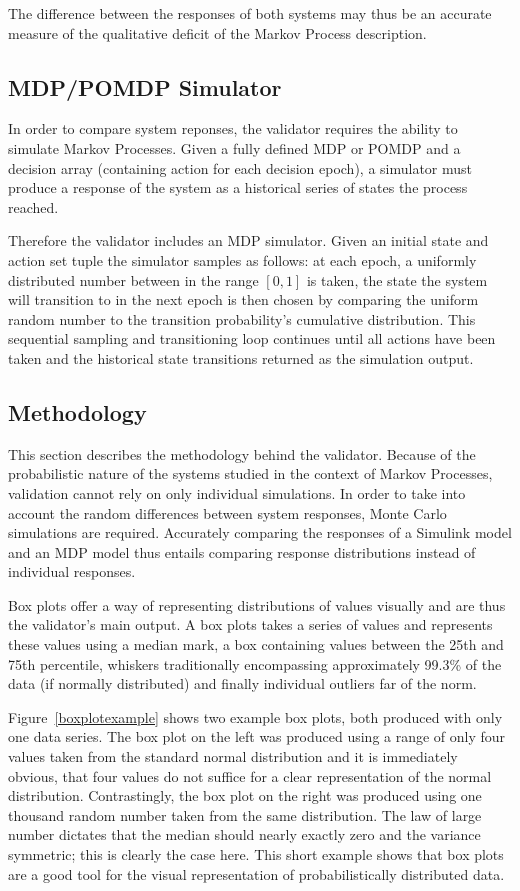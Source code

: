 The difference between the responses of both systems may thus be an accurate measure of the qualitative deficit of the Markov Process description.

\subsection{MDP/POMDP Simulator}

In order to compare system reponses, the validator requires the ability to simulate Markov Processes. Given a fully defined MDP or POMDP and a decision array (containing action for each decision epoch), a simulator must produce a response of the system as a historical series of states the process reached.

Therefore the validator includes an MDP simulator. Given an initial state and action set tuple the simulator samples as follows: at each epoch, a uniformly distributed number between in the range $[0,1]$ is taken, the state the system will transition to in the next epoch is then chosen by comparing the uniform random number to the transition probability's cumulative distribution. This sequential sampling and transitioning loop continues until all actions have been taken and the historical state transitions returned as the simulation output.

\subsection{Methodology}
\label{subsec:validationmethodology}

This section describes the methodology behind the validator. Because of the probabilistic nature of the systems studied in the context of Markov Processes, validation cannot rely on only individual simulations. In order to take into account the random differences between system responses, Monte Carlo simulations are required. Accurately comparing the responses of a Simulink model and an MDP model thus entails comparing response distributions instead of individual responses.

Box plots offer a way of representing distributions of values visually and are thus the validator's main output. A box plots takes a series of values and represents these values using a median mark, a box containing values between the 25th and 75th percentile, whiskers traditionally encompassing approximately 99.3\% of the data (if normally distributed) and finally individual outliers far of the norm.

Figure~\ref{boxplotexample} shows two example box plots, both produced with only one data series. The box plot on the left was produced using a range of only four values taken from the standard normal distribution and it is immediately obvious, that four values do not suffice for a clear representation of the normal distribution. Contrastingly, the box plot on the right was produced using one thousand random number taken from the same distribution. The law of large number dictates that the median should nearly exactly zero and the variance symmetric; this is clearly the case here. This short example shows that box plots are a good tool for the visual representation of probabilistically distributed data.

